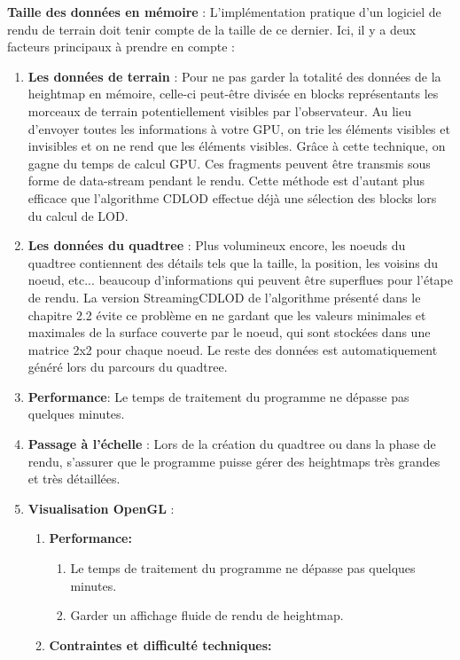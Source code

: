 \documentclass[12pt]{report}
\begin{document}
\textbf{Taille des données en mémoire} : L'implémentation pratique d'un logiciel de rendu de terrain doit tenir compte de la taille de ce dernier. Ici, il y a deux facteurs principaux à prendre en compte :
\begin{enumerate}
    \item \textbf{Les données de terrain} : Pour ne pas garder la totalité des données de la heightmap en mémoire, celle-ci peut-être divisée en blocks représentants les morceaux de terrain potentiellement visibles par l'observateur. Au lieu d'envoyer toutes les informations à votre GPU, on trie les éléments visibles et invisibles et on ne rend que les éléments visibles. Grâce à cette technique, on gagne du temps de calcul GPU. Ces fragments peuvent être transmis sous forme de data-stream pendant le rendu. Cette méthode est d'autant plus efficace que l'algorithme CDLOD effectue déjà une sélection des blocks lors du calcul de LOD. 
    \item \textbf{Les données du quadtree} : Plus volumineux encore, les noeuds du quadtree contiennent des détails tels que la taille, la position, les voisins du noeud, etc... beaucoup d'informations qui peuvent être superflues pour l'étape de rendu. La version StreamingCDLOD de l'algorithme présenté dans le chapitre 2.2 évite ce problème en ne gardant que les valeurs minimales et maximales de la surface couverte par le noeud, qui sont stockées dans une matrice 2x2 pour chaque noeud. Le reste des données est automatiquement généré lors du parcours du quadtree.
    \item \textbf{Performance}: Le temps de traitement du programme ne dépasse pas quelques minutes.
    \item \textbf{Passage à l'échelle} : Lors de la création du quadtree ou dans la phase de rendu, s'assurer que le programme puisse gérer des heightmaps très grandes et très détaillées.
    \item \textbf{Visualisation OpenGL} :
    \begin{enumerate}
        \item \textbf{Performance:}
        \begin{enumerate}
            \item Le temps de traitement du programme ne dépasse pas quelques minutes.
            \item Garder un affichage fluide de rendu de heightmap.
        \end{enumerate}
            \item \textbf{Contraintes et difficulté techniques:}

\end{enumerate}
\end{enumerate}
\end{document}

